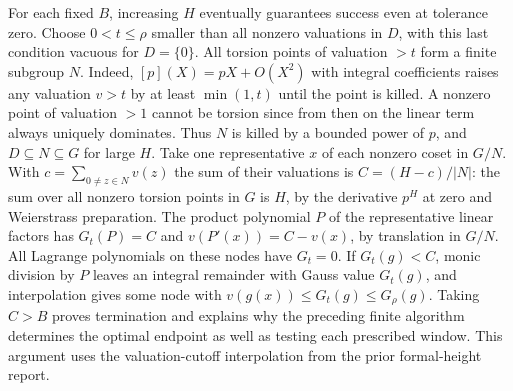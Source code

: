 For each fixed $B$, increasing $H$ eventually guarantees success even at tolerance zero.
Choose $0<t\le\rho$ smaller than all nonzero valuations in $D$,
with this last condition vacuous for $D=\{0\}$. All torsion points
of valuation $>t$ form a finite subgroup $N$. Indeed,
$[p](X)=pX+O(X^2)$ with integral coefficients raises any valuation
$v>t$ by at least $\min(1,t)$ until the point is killed. A nonzero
point of valuation $>1$ cannot be torsion since from then on the
linear term always uniquely dominates. Thus $N$ is killed by a
bounded power of $p$, and $D\subseteq N\subseteq G$ for large $H$.
Take one representative $x$ of each nonzero coset in $G/N$. With
$c=\sum_{0\ne z\in N}v(z)$ the sum of their valuations is
$C=(H-c)/|N|$: the sum over all nonzero torsion points in $G$ is
$H$, by the derivative $p^H$ at zero and Weierstrass preparation.
The product polynomial $P$ of the representative linear factors
has $G_t(P)=C$ and $v(P'(x))=C-v(x)$, by translation in $G/N$.
All Lagrange polynomials on these nodes have $G_t=0$. If $G_t(g)<C$,
monic division by $P$ leaves an integral remainder with Gauss value
$G_t(g)$, and interpolation gives some node with
$v(g(x))\le G_t(g)\le G_\rho(g)$. Taking $C>B$ proves termination and
explains why the preceding finite algorithm determines the optimal
endpoint as well as testing each prescribed window. This argument uses
the valuation-cutoff interpolation from the prior formal-height report.
